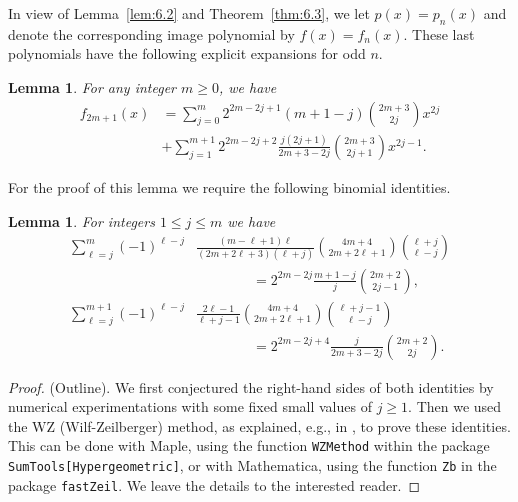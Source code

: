 \documentclass{amsart}
\theoremstyle{plain}
\newtheorem{lemma}[theorem]{Lemma}
\numberwithin{equation}{section}
\begin{document}
\medskip
In view of Lemma~\ref{lem:6.2} and Theorem~\ref{thm:6.3}, we let $p(x)=p_n(x)$ 
and denote the corresponding image polynomial by $f(x)=f_n(x)$. These last
polynomials have the following explicit expansions for odd $n$.

\begin{lemma}\label{lem:6.6}
For any integer $m\geq 0$, we have
\begin{align}
f_{2m+1}(x)&=\sum_{j=0}^m 2^{2m-2j+1}(m+1-j)\binom{2m+3}{2j}x^{2j}\label{6.19}\\
&+\sum_{j=1}^{m+1} 2^{2m-2j+2}\frac{j(2j+1)}{2m+3-2j}\binom{2m+3}{2j+1}x^{2j-1}.\nonumber
\end{align}
\end{lemma}

\medskip
For the proof of this lemma we require the following binomial identities.

\begin{lemma}\label{lem:6.5}
For integers $1\leq j\leq m$ we have
\begin{align}
\sum_{\ell=j}^m(-1)^{\ell-j}&\frac{(m-\ell+1)\ell}{(2m+2\ell+3)(\ell+j)}
\binom{4m+4}{2m+2\ell+1}\binom{\ell+j}{\ell-j}\label{6.10} \\
&\qquad\qquad=2^{2m-2j}\frac{m+1-j}{j}\binom{2m+2}{2j-1},\nonumber \\
\sum_{\ell=j}^{m+1}(-1)^{\ell-j}&\frac{2\ell-1}{\ell+j-1}
\binom{4m+4}{2m+2\ell+1}\binom{\ell+j-1}{\ell-j} \label{6.11}\\
&\qquad\qquad=2^{2m-2j+4}\frac{j}{2m+3-2j}\binom{2m+2}{2j}.\nonumber
\end{align}
\end{lemma}

\begin{proof}(Outline).
We first conjectured the right-hand sides of both identities by numerical
experimentations with some fixed small values of $j\geq 1$. Then we used the
WZ (Wilf-Zeilberger) method, as explained, e.g., in \cite{PWZ}, to prove these 
identities. This can be done with Maple, using the function {\tt WZMethod}
within the package {\tt SumTools[Hypergeometric]}, or with Mathematica, using
the function {\tt Zb} in the package {\tt fastZeil}. We leave the details to the interested reader.
\end{proof}
\end{document}
